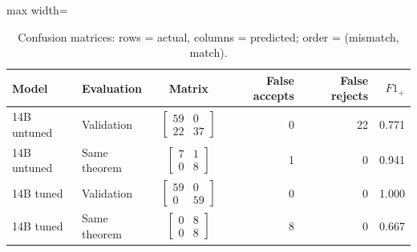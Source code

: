 \begin{table}[htbp]
\centering
\caption{Confusion matrices: rows = actual, columns = predicted; order = (mismatch, match).}
\label{tab:random-swap-confusion}
\small
\begin{adjustbox}{max width=\textwidth}
\begin{tabular}{llcrrr}
\toprule
Model & Evaluation & Matrix & False accepts & False rejects & $F1_+$ \\
\midrule
14B untuned & Validation & $\left[\begin{array}{rr}59&0\\22&37\end{array}\right]$ & 0 & 22 & 0.771 \\
14B untuned & Same theorem & $\left[\begin{array}{rr}7&1\\0&8\end{array}\right]$ & 1 & 0 & 0.941 \\
14B tuned & Validation & $\left[\begin{array}{rr}59&0\\0&59\end{array}\right]$ & 0 & 0 & 1.000 \\
14B tuned & Same theorem & $\left[\begin{array}{rr}0&8\\0&8\end{array}\right]$ & 8 & 0 & 0.667 \\
\bottomrule
\end{tabular}
\end{adjustbox}
\end{table}
